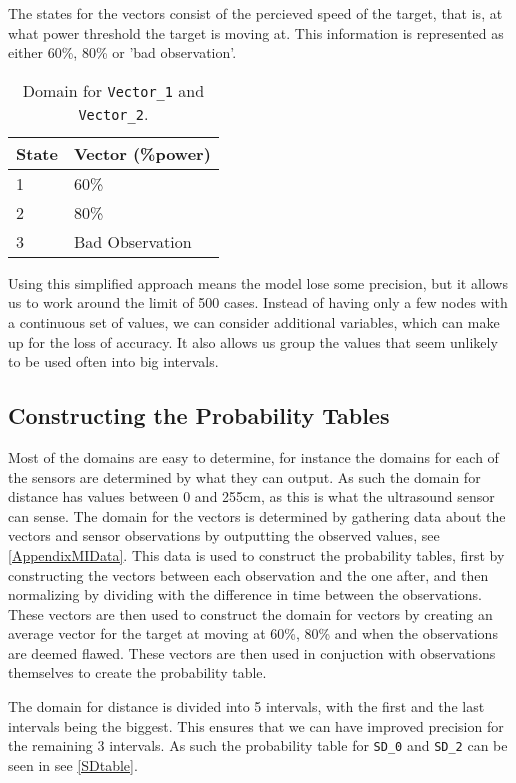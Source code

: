 The states for the vectors consist of the percieved speed of the target, that
is, at what power threshold the target is moving at. This information is
represented as either 60\%, 80\% or 'bad observation'.

\begin{table}[H]
\centering
\label{vecDom}
\begin{tabular}{l|l}
State & Vector (\%power) \\ \hline
1     & 60\%             \\
2     & 80\%             \\
3     & Bad Observation
\end{tabular}
\caption{Domain for \texttt{Vector\_1} and \texttt{Vector\_2}.}
\end{table}

Using this simplified approach  means the model lose some precision, but it allows us to
work around the limit of 500 cases. Instead of having only a few nodes with a
continuous set of values, we can consider additional variables, which can
make up for the loss of accuracy. It also allows us group the values
that seem unlikely to be used often into big intervals.


\subsection{Constructing the Probability Tables}

Most of the domains are easy to determine, for instance the domains for each of
the sensors are determined by what they can output. As such the domain for
distance has values between 0 and 255cm, as this is what the ultrasound sensor
can sense. The domain for the vectors is determined by gathering data about the
vectors and sensor observations by outputting the observed values, see
\autoref{AppendixMIData}. This data is used to construct the
probability tables, first by constructing the vectors between each
observation and the one after, and then normalizing by dividing with the
difference in time between the observations. These vectors are then used to
construct the domain for vectors by creating an average vector for the target
at moving at 60\%, 80\% and when the observations are deemed flawed. These
vectors are then used in conjuction with observations themselves to create the
probability table.\nl

The domain for distance is divided into 5 intervals, with the first and the last
intervals being the biggest. This ensures that we can have improved precision
for the remaining 3 intervals. As such the probability table for \texttt{SD\_0}
and \texttt{SD\_2} can be seen in see \autoref{SDtable}.

